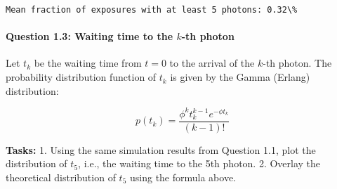\documentclass[11pt]{article}
\begin{document}
    \begin{Verbatim}[commandchars=\\\{\}]
Mean fraction of exposures with at least 5 photons: 0.32\%
    \end{Verbatim}

    \paragraph{\texorpdfstring{Question 1.3: Waiting time to the \(k\)-th
photon}{Question 1.3: Waiting time to the k-th photon}}\label{question-1.3-waiting-time-to-the-k-th-photon}

Let \(t_k\) be the waiting time from \(t=0\) to the arrival of the
\(k\)-th photon. The probability distribution function of \(t_k\) is
given by the Gamma (Erlang) distribution:

\[p(t_k) = \frac{\phi^k t_k^{k-1} e^{-\phi t_k}}{(k-1)!}\]

\textbf{Tasks:} 1. Using the same simulation results from Question 1.1,
plot the distribution of \(t_5\), i.e., the waiting time to the 5th
photon. 2. Overlay the theoretical distribution of \(t_5\) using the
formula above.
\end{document}
